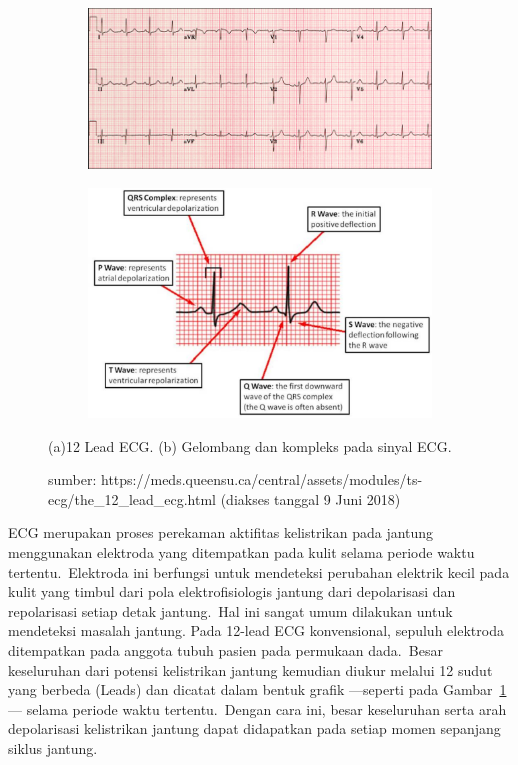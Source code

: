 \begin{figure}[ht]
	\vspace{0.5em}
	\centering
	\begin{subfigure}[b]{0.49\textwidth}
		\includegraphics[width=\textwidth]{Normal_ECG}
		\caption{}
	\end{subfigure}             
	\begin{subfigure}[b]{0.49\textwidth}
		\includegraphics[width=\textwidth]{wave_and_complex}
		\caption{}
	\end{subfigure}
	\caption{(a)12 Lead ECG. (b) Gelombang dan kompleks pada sinyal ECG.}
	\caption*{sumber: https://meds.queensu.ca/central/assets/modules/ts-ecg/the\_12\_lead\_ecg.html (diakses tanggal 9 Juni 2018)}
	\label{fig:ecg_wave}
\end{figure}

ECG merupakan proses perekaman aktifitas kelistrikan pada jantung menggunakan elektroda yang ditempatkan pada kulit selama periode waktu tertentu.~Elektroda ini berfungsi untuk mendeteksi perubahan elektrik kecil pada kulit yang timbul dari pola elektrofisiologis jantung dari depolarisasi dan repolarisasi setiap detak jantung.~Hal ini sangat umum dilakukan untuk mendeteksi masalah jantung.
Pada 12-lead ECG konvensional, sepuluh elektroda ditempatkan pada anggota tubuh pasien pada permukaan dada.~Besar keseluruhan dari potensi kelistrikan jantung kemudian diukur melalui 12 sudut yang berbeda (Leads) dan dicatat dalam bentuk grafik ---seperti pada Gambar~\ref{fig:ecg_wave}--- selama periode waktu tertentu.~Dengan cara ini, besar keseluruhan serta arah depolarisasi kelistrikan jantung dapat didapatkan pada setiap momen sepanjang siklus jantung.


